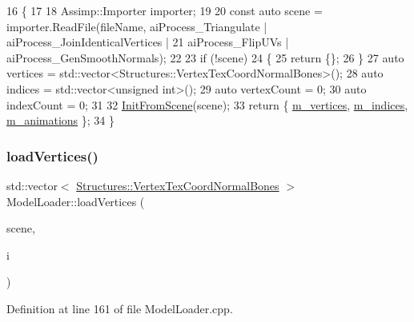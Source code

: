 \begin{DoxyCode}
16                                                                            \{
17 
18     Assimp::Importer importer;
19 
20     \textcolor{keyword}{const} \textcolor{keyword}{auto} scene = importer.ReadFile(fileName, aiProcess\_Triangulate | aiProcess\_JoinIdenticalVertices 
      |
21         aiProcess\_FlipUVs | aiProcess\_GenSmoothNormals);
22 
23     \textcolor{keywordflow}{if} (!scene)
24     \{
25         \textcolor{keywordflow}{return} \{\};
26     \}
27     \textcolor{keyword}{auto} vertices = std::vector<Structures::VertexTexCoordNormalBones>();
28     \textcolor{keyword}{auto} indices = std::vector<unsigned int>();
29     \textcolor{keyword}{auto} vertexCount = 0;
30     \textcolor{keyword}{auto} indexCount = 0;
31 
32     \mbox{\hyperlink{class_model_loader_ae809d56b350b003306b484c3bbc1b5e3}{InitFromScene}}(scene);
33     \textcolor{keywordflow}{return} \{ \mbox{\hyperlink{class_model_loader_ac87b9662dae9c00b140bc90c30c088ee}{m\_vertices}}, \mbox{\hyperlink{class_model_loader_a6d63371db7677b60c2c000f23c7fb8f6}{m\_indices}}, \mbox{\hyperlink{class_model_loader_a2b9cf4d8fe3432ddc656651057c78860}{m\_animations}} \};
34 \}
\end{DoxyCode}
\mbox{\label{class_model_loader_a90e1f853324d4aee05ba5db140aa974d}} 
\subsubsection{\texorpdfstring{load\+Vertices()}{loadVertices()}}
{\footnotesize\ttfamily std\+::vector$<$ \mbox{\hyperlink{struct_structures_1_1_vertex_tex_coord_normal_bones}{Structures\+::\+Vertex\+Tex\+Coord\+Normal\+Bones}} $>$ Model\+Loader\+::load\+Vertices (\begin{DoxyParamCaption}\item[{const ai\+Scene $\ast$}]{scene,  }\item[{const int}]{i }\end{DoxyParamCaption})\hspace{0.3cm}{\ttfamily [private]}}



Definition at line 161 of file Model\+Loader.\+cpp.


